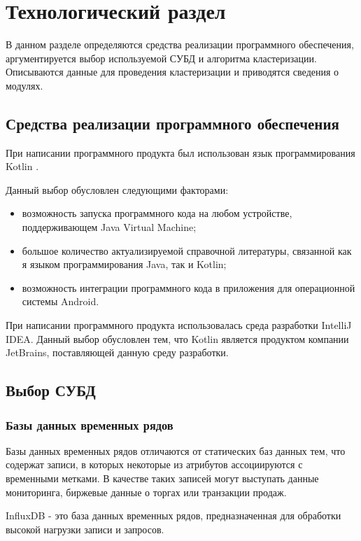 \section{Технологический раздел}
В данном разделе определяются средства реализации программного обеспечения, аргументируется выбор используемой СУБД и алгоритма кластеризации. Описываются данные для проведения кластеризации и приводятся сведения о модулях.

\subsection{Средства реализации программного обеспечения}
При написании программного продукта был использован язык программирования Kotlin \cite{Kotlin}.

Данный выбор обусловлен следующими факторами:
\begin{itemize}[leftmargin=1.6\parindent]
	\item возможность запуска программного кода на любом устройстве, поддерживающем Java Virtual Machine;
	\item большое количество актуализируемой справочной литературы, связанной как я языком программирования Java, так и Kotlin;
	\item возможность интеграции программного кода в приложения для операционной системы Android.
\end{itemize}

При написании программного продукта использовалась среда разработки IntelliJ IDEA. Данный выбор обусловлен тем, что Kotlin является продуктом компании JetBrains, поставляющей данную среду разработки.

\subsection{Выбор СУБД}

\subsubsection{Базы данных временных рядов}
Базы данных временных рядов отличаются от статических баз данных тем, что содержат записи, в которых некоторые из атрибутов ассоциируются с временными метками. В качестве таких записей могут выступать данные мониторинга, биржевые данные о торгах или транзакции продаж. \cite{bdvrAnomalies}

InfluxDB - это база данных временных рядов, предназначенная для обработки высокой нагрузки записи и запросов.

